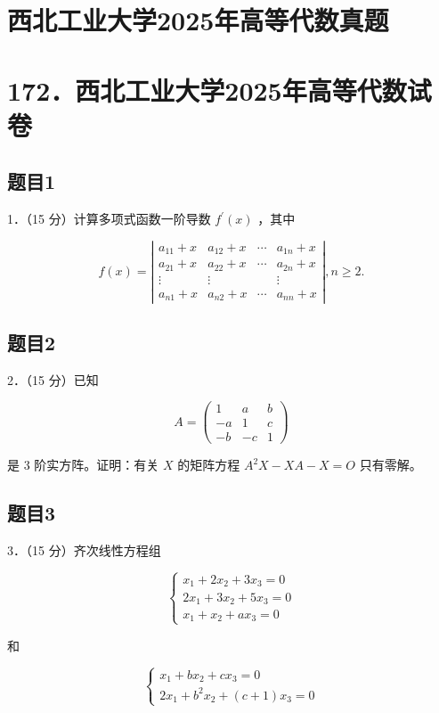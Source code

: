 \documentclass{article}
\begin{document}
\section*{西北工业大学2025年高等代数真题}
\section*{172．西北工业大学2025年高等代数试卷}

\subsection{题目1}
1．（15 分）计算多项式函数一阶导数 \(f^{\prime}(x)\) ，其中

\[
f(x)=\left|\begin{array}{cccc}
a_{11}+x & a_{12}+x & \cdots & a_{1 n}+x \\
a_{21}+x & a_{22}+x & \cdots & a_{2 n}+x \\
\vdots & \vdots & & \vdots \\
a_{n 1}+x & a_{n 2}+x & \cdots & a_{n n}+x
\end{array}\right|, n \geq 2 .
\]

\subsection{题目2}
2．（15 分）已知

\[
A=\left(\begin{array}{ccc}
1 & a & b \\
-a & 1 & c \\
-b & -c & 1
\end{array}\right)
\]

是 3 阶实方阵。证明：有关 \(X\) 的矩阵方程 \(A^{2} X-X A-X=O\) 只有零解。

\subsection{题目3}
3．（15 分）齐次线性方程组

\[
\left\{\begin{array}{l}
x_{1}+2 x_{2}+3 x_{3}=0 \\
2 x_{1}+3 x_{2}+5 x_{3}=0 \\
x_{1}+x_{2}+a x_{3}=0
\end{array}\right.
\]

和

\[
\left\{\begin{array}{l}
x_{1}+b x_{2}+c x_{3}=0 \\
2 x_{1}+b^{2} x_{2}+(c+1) x_{3}=0
\end{array}\right.
\]
\end{document}
